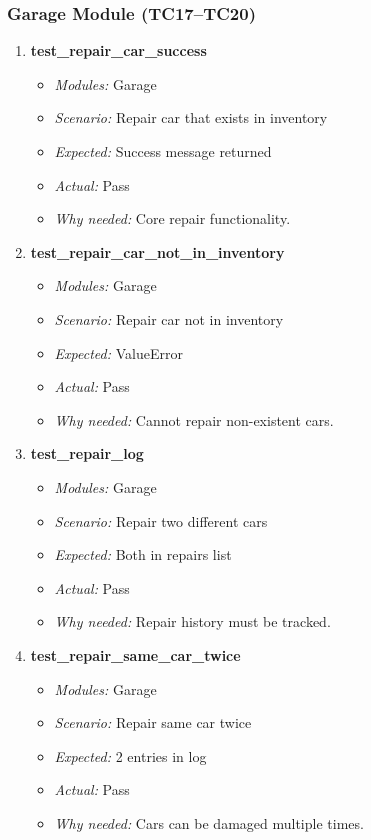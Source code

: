 \documentclass{article}
\begin{document}
\subsubsection*{Garage Module (TC17--TC20)}
\begin{enumerate}[resume, label=\textbf{TC\arabic*.}]

\item \textbf{test\_repair\_car\_success}
\begin{itemize}[noitemsep]
  \item \textit{Modules:} Garage
  \item \textit{Scenario:} Repair car that exists in inventory
  \item \textit{Expected:} Success message returned
  \item \textit{Actual:} Pass
  \item \textit{Why needed:} Core repair functionality.
\end{itemize}

\item \textbf{test\_repair\_car\_not\_in\_inventory}
\begin{itemize}[noitemsep]
  \item \textit{Modules:} Garage
  \item \textit{Scenario:} Repair car not in inventory
  \item \textit{Expected:} ValueError
  \item \textit{Actual:} Pass
  \item \textit{Why needed:} Cannot repair non-existent cars.
\end{itemize}

\item \textbf{test\_repair\_log}
\begin{itemize}[noitemsep]
  \item \textit{Modules:} Garage
  \item \textit{Scenario:} Repair two different cars
  \item \textit{Expected:} Both in repairs list
  \item \textit{Actual:} Pass
  \item \textit{Why needed:} Repair history must be tracked.
\end{itemize}

\item \textbf{test\_repair\_same\_car\_twice}
\begin{itemize}[noitemsep]
  \item \textit{Modules:} Garage
  \item \textit{Scenario:} Repair same car twice
  \item \textit{Expected:} 2 entries in log
  \item \textit{Actual:} Pass
  \item \textit{Why needed:} Cars can be damaged multiple times.
\end{itemize}

\end{enumerate}
\end{document}
